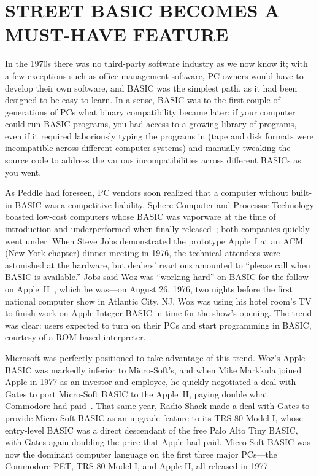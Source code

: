 
\section{STREET BASIC BECOMES A MUST-HAVE FEATURE}


In the 1970s there was no third-party software industry as we now know
it; with a few exceptions such as office-management software, PC owners
would have to develop their own software, and BASIC was the simplest
path, as it had been designed to be easy to learn.
In a sense, BASIC was to the first couple of generations of PCs what
binary compatibility became later: if your computer could run BASIC
programs, you had access to a growing library of programs, even if it
required laboriously typing the programs in (tape and disk formats were
incompatible across different computer systems) and  manually tweaking
the source code to address the various incompatibilities across
different BASICs as you went.

As Peddle had foreseen, PC vendors soon realized that a computer without
built-in BASIC was a competitive liability.
Sphere Computer and Processor Technology boasted low-cost computers
whose BASIC was vaporware at the time of introduction and underperformed
when finally released~\cite[p. 114, 134]{veit}; both companies quickly
went under.
When Steve Jobs demonstrated the prototype Apple~I at an ACM (New York
chapter) dinner meeting in 1976, the technical attendees were astonished at the
hardware, but dealers' reactions amounted to ``please call when BASIC is
available.''
Jobs said Woz was ``working hard'' on BASIC for the follow-on
Apple~II~\cite[pp. 92ff]{veit}, which 
he was---on August 26, 1976, two nights before the first national computer show in
Atlantic City, NJ, Woz was using his hotel room's TV to finish work on
Apple Integer BASIC in time for the show's opening.
The trend was clear: users expected to turn on their PCs and
start programming in BASIC, courtesy of a ROM-based interpreter.

Microsoft was perfectly positioned to take advantage of this trend.
Woz's Apple BASIC was markedly inferior to Micro-Soft's, and when Mike
Markkula joined Apple in 1977 as an investor and employee, he
quickly negotiated a deal with Gates to port Micro-Soft BASIC to
the Apple~II, paying double what Commodore had
paid~\cite[p. 114]{commodore}.
That same year, Radio Shack made a deal with Gates to provide Micro-Soft
BASIC as an upgrade feature to its TRS-80 Model I, whose entry-level BASIC
was a direct descendant of the free Palo Alto Tiny BASIC, with Gates
again doubling the price that Apple had paid.
Micro-Soft BASIC was now the dominant computer language on the first
three major PCs---the Commodore PET, TRS-80 Model I, and Apple II, all
released in 1977.


